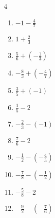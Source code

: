 \begin{multicols}{4}
\begin{enumerate}

  \item $\displaystyle -1 - \frac{4}{7}$


  \item $\displaystyle 1 + \frac{2}{3}$


  \item $\displaystyle \frac{5}{6} + \left(-\frac{1}{3}\right)$


  \item $\displaystyle -\frac{8}{3} + \left(-\frac{4}{7}\right)$


  \item $\displaystyle \frac{3}{5} + \left(-1\right)$


\columnbreak %

  \item $\displaystyle \frac{1}{5} - 2$


  \item $\displaystyle -\frac{2}{3} - \left(-1\right)$


  \item $\displaystyle \frac{7}{6} - 2$


  \item $\displaystyle -\frac{1}{2} - \left(-\frac{4}{5}\right)$


  \item $\displaystyle -\frac{7}{8} - \left(-\frac{1}{2}\right)$


  \item $\displaystyle -\frac{5}{8} - 2$


  \item $\displaystyle -\frac{9}{2} - \left(-\frac{7}{6}\right)$


\end{enumerate}
\end{multicols}
